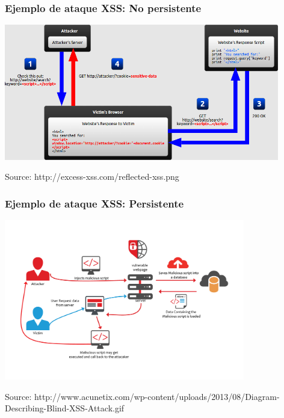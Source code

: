 \begin{frame}
\frametitle{Ejemplo de ataque XSS: No persistente}

\begin{center}
  \includegraphics[width=12cm]{figs/reflected-xss}
\end{center}


\begin{flushright}
{\tiny
Source: http://excess-xss.com/reflected-xss.png
}
\end{flushright}

\end{frame}


\begin{frame}
\frametitle{Ejemplo de ataque XSS: Persistente}

\begin{center}
  \includegraphics[width=10.5cm]{figs/Diagram-Describing-Blind-XSS-Attack}
\end{center}


\begin{flushright}
{\tiny
Source: http://www.acunetix.com/wp-content/uploads/2013/08/Diagram-Describing-Blind-XSS-Attack.gif
}
\end{flushright}

\end{frame}


